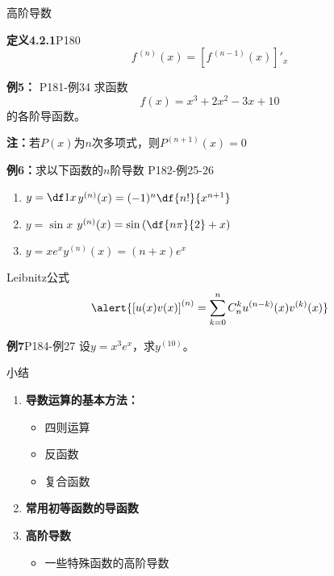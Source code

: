 \begin{frame}{高阶导数}
	\linespread{1.2}\pause 
	\begin{block}{{\bf 定义4.2.1}\hfill P180}
		$$f^{\,(n)}(x)=\left[f^{\,(n-1)}(x)\right]'_x$$
	\end{block}\pause 
	\begin{exampleblock}{{\bf 例5：} \hfill P181-例34}
		求函数
		$$f(x)=x^3+2x^2-3x+10$$
		的各阶导函数。
	\end{exampleblock}\pause 
	{\bf 注：}\alert{若$P(x)$为$n$次多项式，则$P^{(n+1)}(x)=0$}
\end{frame}

\begin{frame}
	\linespread{2}
	\begin{exampleblock}{{\bf 例6：}求以下函数的$n$阶导数 \hfill P182-例25-26}
		\begin{enumerate}
		  \item $y=\df 1x$\pause \hfill $y^{(n)}(x)=(-1)^n\df{n!}{x^{n+1}}$\pause 
		  \item $y=\sin x$\pause \hfill
		  $y^{(n)}(x)=\sin\left(\df{n\pi}{2}+x\right)$\pause 
		  \item $y=xe^x$\pause \hfill $y^{(n)}(x)=(n+x)e^x$
		\end{enumerate}
	\end{exampleblock}
\end{frame}

\begin{frame}
	\linespread{1.2}
	{\bb Leibnitz公式}
	$$\alert{\left[u(x)v(x)\right]^{(n)}=\sum\limits_{k=0}^nC_n^ku^{(n-k)}(x)v^{(k)}(x)}$$
	\pause 
	\begin{exampleblock}{{\bf 例7}\hfill P184-例27}
		设$y=x^3e^x$，求$y^{(10)}$。
	\end{exampleblock}
\end{frame}

\begin{frame}[<+->]{小结}
	\linespread{1.5}
	\begin{enumerate}
	  \item {\bf 导数运算的基本方法：}
	  \begin{itemize}
	    \item 四则运算
	    \item 反函数
	    \item 复合函数
	  \end{itemize}
	  \item {\bf 常用初等函数的导函数}
	  \item {\bf 高阶导数}
	  \begin{itemize}
	    \item 一些特殊函数的高阶导数
	  \end{itemize}
	\end{enumerate}
\end{frame}


